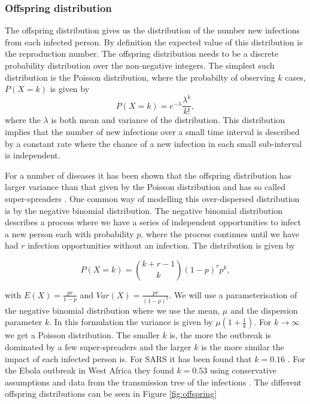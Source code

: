 \documentclass[12pt]{article}
\begin{document}
\subsubsection{Offspring distribution}
The offspring distribution gives us the distribution of the number new infections from each infected person. By definition the expected value of this distribution is the reproduction number. The offspring distribution needs to be a discrete probability distribution over the non-negative integers. The simplest such distribution is the Poisson distribution, where the probabilty of observing $k$ cases, $P(X=k)$ is given by
\[P(X=k) = e^{-\lambda}\frac{\lambda^k}{k!}, \]
where the $\lambda$ is both  mean and variance of the distribution. This distribution implies that the number of new infections over a small time interval is described by a constant rate where the chance of a new infection in each small sub-interval is independent.

For a number of diseases it has been shown that the offspring distribution has larger variance than that given by the Poisson distribution and has so called super-spreaders \cite{lloyd-smithSuperspreadingEffectIndividual2005}. One common way of modelling this over-dispersed distribution is by the negative binomial distribution. The negative binomial distribution describes a process where we have a series of independent opportunities to infect a new person each with probability $p$, where the process continues until we have had $r$ infection opportunities without an infection. The distribution is given by

\[P(X=k) = {k + r - 1 \choose k} (1-p)^rp^k, \]

with $E(X)=\frac{pr}{1-p}$ and $Var(X) = \frac{pr}{(1-p)^2}$. We will use a parameterisation of the negative binomial distribution where we use the mean, $\mu$ and the dispersion parameter $k$. In this formulation the variance is given by $\mu(1 + \frac{1}{k})$. For $k \rightarrow \infty$ we get a Poisson distribution. The smaller $k$ is, the more the outbreak is dominated by a few super-spreaders and the larger $k$ is the more similar the impact of each infected person is. For SARS it has been found that $k=0.16$ \cite{lloyd-smithSuperspreadingEffectIndividual2005}. For the Ebola outbreak in West Africa they found $k=0.53$ using conservative assumptions and data from the transmission tree of the infections \cite{internationalebolaresponseteamExposurePatternsDriving2016}. The different offspring distributions can be seen in Figure \ref{fig:offspring}
\end{document}
